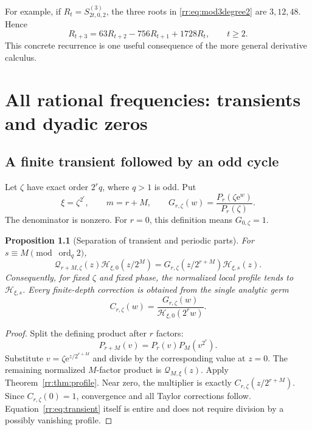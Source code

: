 \documentclass[11pt,a4paper,oneside,openany]{book}
\numberwithin{equation}{chapter}
\newtheorem{proposition}[theorem]{Proposition}
\theoremstyle{definition}
\theoremstyle{remark}
\newcommand{\e}{\mathrm e}
\DeclareMathOperator{\ord}{ord}
\newcommand{\Hp}{\mathcal H}
\newcommand{\Qp}{\mathcal Q}
\begin{document}
For example, if \(R_t=S^{(3)}_{2t,0,2}\), the three roots in \eqref{rr:eq:mod3degree2} are \(3,12,48\). Hence
\begin{equation}
 R_{t+3}=63R_{t+2}-756R_{t+1}+1728R_t,\qquad t\geq2.
 \label{rr:eq:explicitrecurrence}
\end{equation}
This concrete recurrence is one useful consequence of the more general derivative calculus.
\chapter{All rational frequencies: transients and dyadic zeros}
\label{rr:sec:dyadic}

\section{A finite transient followed by an odd cycle}
Let \(\zeta\) have exact order \(2^rq\), where \(q>1\) is odd. Put
\[
 \xi=\zeta^{2^r},\qquad m=r+M,\qquad
 G_{r,\zeta}(w)=\frac{P_r(\zeta\e^w)}{P_r(\zeta)}.
\]
The denominator is nonzero. For \(r=0\), this definition means \(G_{0,\zeta}=1\).

\begin{proposition}[Separation of transient and periodic parts]
For \(s\equiv M\pmod{\ord_q2}\),
\begin{equation}
 \Qp_{r+M,\zeta}(z)\Hp_{\xi,0}(z/2^M)
 =G_{r,\zeta}(z/2^{r+M})\Hp_{\xi,s}(z).
 \label{rr:eq:transient}
\end{equation}
Consequently, for fixed \(\zeta\) and fixed phase, the normalized local profile tends to \(\Hp_{\xi,s}\). Every finite-depth correction is obtained from the single analytic germ
\begin{equation}
 C_{r,\zeta}(w)=\frac{G_{r,\zeta}(w)}{\Hp_{\xi,0}(2^rw)}.
 \label{rr:eq:transientcorrection}
\end{equation}
\end{proposition}
\begin{proof}
Split the defining product after \(r\) factors:
\[
 P_{r+M}(v)=P_r(v)P_M(v^{2^r}).
\]
Substitute \(v=\zeta\e^{z/2^{r+M}}\) and divide by the corresponding value at \(z=0\). The remaining normalized \(M\)-factor product is \(\Qp_{M,\xi}(z)\). Apply Theorem~\ref{rr:thm:profile}. Near zero, the multiplier is exactly \(C_{r,\zeta}(z/2^{r+M})\). Since \(C_{r,\zeta}(0)=1\), convergence and all Taylor corrections follow. Equation~\eqref{rr:eq:transient} itself is entire and does not require division by a possibly vanishing profile.
\end{proof}
\end{document}
